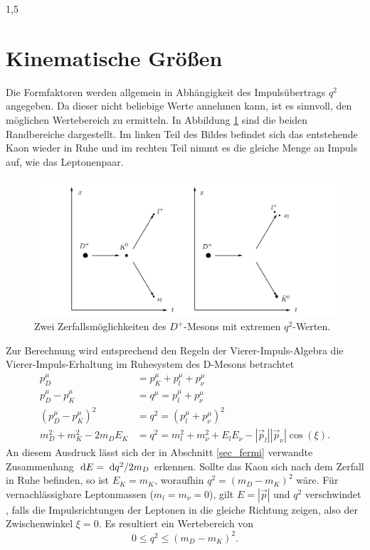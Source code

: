 \documentclass[11pt,a4paper,twoside]{report}
\begin{document}
\begin{spacing}{1,5}
\section{Kinematische Größen}
\vspace{-0.5cm}
Die Formfaktoren werden allgemein in Abhängigkeit des Impulsübertrags $q^2$ angegeben. Da dieser nicht beliebige Werte annehmen kann, ist es sinnvoll, den 
möglichen Wertebereich zu ermitteln.  In Abbildung \ref{pic_DZerfall} sind die beiden Randbereiche dargestellt. Im linken Teil des Bildes befindet sich das 
entstehende Kaon wieder in Ruhe und im rechten Teil nimmt es die gleiche Menge an Impuls auf, wie das Leptonenpaar.
\begin{figure}[H]
\includegraphics[width=1\textwidth]{Abbildungen/DZerfall.png}
\caption{Zwei Zerfallsmöglichkeiten des $D^+$-Mesons  mit extremen $q^2$-Werten.}
\label{pic_DZerfall}
\end{figure}
\noindent
Zur Berechnung wird entsprechend den Regeln der Vierer-Impuls-Algebra die Vierer-Impuls-Erhaltung im Ruhesystem des D-Mesons betrachtet
\begin{align}
 p_D^\mu &= p_K^\mu + p_l^\mu + p_\nu^\mu \nonumber\\
 p_D^\mu - p_K^\mu &= q^\mu = p_l^\mu + p_\nu^\mu \nonumber\\
 \left(p_D^\mu-p_K^\mu\right)^2 &= q^2 =  (p_l^\mu + p_\nu^\mu )^2\nonumber\\
 m_D^2 + m_K^2 - 2m_DE_K &= q^2 = m_l^2 + m_\nu^2 + E_lE_\nu - |\vec p_l||\vec p_\nu|\cos(\xi).
\end{align}
An diesem Ausdruck lässt sich der in Abschnitt \ref{sec_fermi} verwandte Zusammenhang $\; \mathrm{d} E = \; \mathrm{d} q^2/2m_D$ erkennen.
Sollte das Kaon sich nach dem Zerfall in Ruhe befinden, so ist $E_K = m_K$, woraufhin $q^2 = (m_D-m_K)^2$ wäre. Für vernachlässigbare Leptonmassen 
($m_l=m_\nu=0$), gilt $E=|\vec p|$ und $q^2$ verschwindet , falls die Impulsrichtungen der Leptonen in die gleiche Richtung zeigen, also der Zwischenwinkel
$\xi = 0$. Es resultiert ein Wertebereich von
\begin{equation}
 0 \leq q^2 \leq (m_D - m_K)^2.
\end{equation}


\end{spacing}
\end{document}
